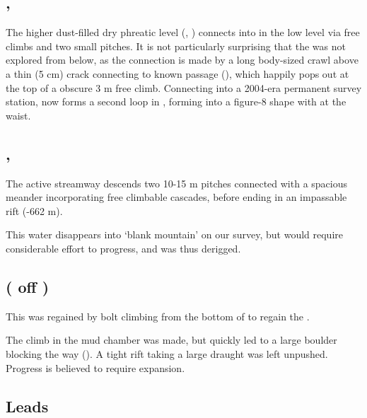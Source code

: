 \subsection{, }

The higher dust-filled dry phreatic level (, ) connects into  in the low level via
free climbs and two small pitches. It is not particularly surprising that the  was not explored from below, as the
connection is made by a long body-sized crawl above a thin (5 cm) crack connecting to known passage (), which happily pops out at the
top of a obscure 3 m free climb. Connecting into a 2004-era permanent survey station,  now forms a second loop in ,
forming  into a figure-8 shape with  at the waist.

\subsection{, }

The active streamway descends two 10-15 m pitches connected with a spacious meander incorporating free climbable cascades, before ending in an impassable rift (-662 m).

This water disappears into `blank mountain' on our survey, but would require considerable effort to progress, and  was thus derigged.


\subsection{ ( off )}

This was regained by bolt climbing from the bottom of  to regain the .

The climb in the mud chamber was made, but quickly led to a large boulder blocking the way (). A tight rift taking a large draught was left unpushed. Progress is believed to require expansion.

\subsection{ Leads}

